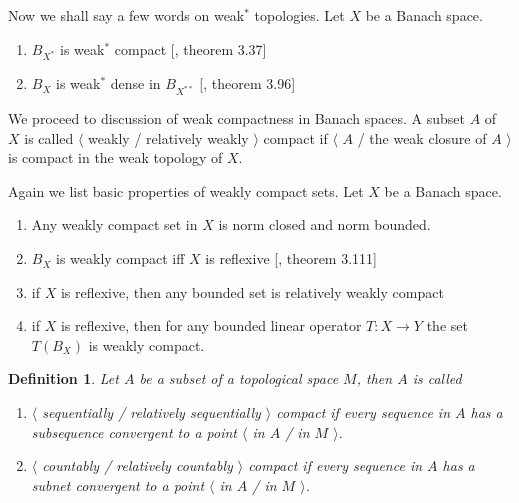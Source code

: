 \documentclass[12pt]{article}
\newtheorem{definition}[theorem]{Definition}
\begin{document}
Now we shall say a few words on weak${}^*$ topologies. Let $X$ be a Banach
space.

\begin{enumerate}[label = (\roman*)]

    \item $B_{X^*}$ is weak${}^*$ compact [\cite{FabHabBanSpTh}, theorem 3.37]

    \item $B_X$ is weak${}^*$ dense in $B_{X^{**}}$ [\cite{FabHabBanSpTh},
                  theorem 3.96]

\end{enumerate}

We proceed to discussion of weak compactness in Banach spaces. A subset $A$ of
$X$ is called $\langle$ weakly / relatively weakly $\rangle$ compact if
$\langle$ $A$ / the weak closure of $A$ $\rangle$ is compact in the weak
topology of $X$.

Again we list basic properties of weakly compact sets. Let $X$ be a Banach
space.

\begin{enumerate}[label = (\roman*)]

    \item Any weakly compact set in $X$ is norm closed and norm bounded.

    \item $B_X$ is weakly compact iff $X$ is reflexive [\cite{FabHabBanSpTh},
                  theorem 3.111]

    \item if $X$ is reflexive, then any bounded set is relatively weakly compact

    \item if $X$ is reflexive, then for any bounded linear operator $T:X\to Y$
          the set $T(B_X)$ is weakly compact.

\end{enumerate}

\begin{definition} Let $A$ be a subset of a topological space $M$, then $A$ is
    called

    \begin{enumerate}[label = (\roman*)]
        \item $\langle$ sequentially / relatively sequentially $\rangle$ compact
              if every sequence in $A$ has a subsequence convergent to a point
              $\langle$ in $A$ / in $M$ $\rangle$.

        \item $\langle$ countably / relatively countably $\rangle$ compact if
              every sequence in $A$ has a subnet convergent to a point $\langle$
              in $A$ / in $M$ $\rangle$.
    \end{enumerate}
\end{definition}
\end{document}
